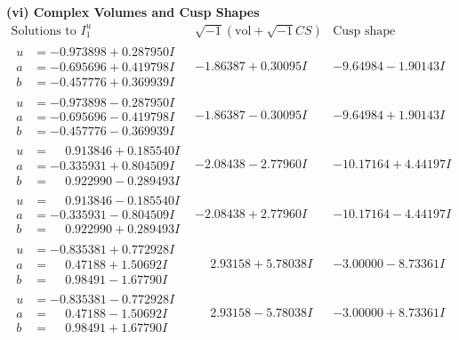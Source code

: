 \documentclass[1p]{elsarticle_modified}
\theoremstyle{definition}
\newcommand{\I}{\sqrt{-1}}
\begin{document}
\newpage\flushleft \textbf{(vi) Complex Volumes and Cusp Shapes}
$$\begin{array}{c|c|c}  
\text{Solutions to }I^u_{1}& \I (\text{vol} + \sqrt{-1}CS) & \text{Cusp shape}\\
 \hline 
\begin{aligned}
u &= -0.973898 + 0.287950 I \\
a &= -0.695696 + 0.419798 I \\
b &= -0.457776 + 0.369939 I\end{aligned}
 & -1.86387 + 0.30095 I & -9.64984 - 1.90143 I \\ \hline\begin{aligned}
u &= -0.973898 - 0.287950 I \\
a &= -0.695696 - 0.419798 I \\
b &= -0.457776 - 0.369939 I\end{aligned}
 & -1.86387 - 0.30095 I & -9.64984 + 1.90143 I \\ \hline\begin{aligned}
u &= \phantom{-}0.913846 + 0.185540 I \\
a &= -0.335931 + 0.804509 I \\
b &= \phantom{-}0.922990 - 0.289493 I\end{aligned}
 & -2.08438 - 2.77960 I & -10.17164 + 4.44197 I \\ \hline\begin{aligned}
u &= \phantom{-}0.913846 - 0.185540 I \\
a &= -0.335931 - 0.804509 I \\
b &= \phantom{-}0.922990 + 0.289493 I\end{aligned}
 & -2.08438 + 2.77960 I & -10.17164 - 4.44197 I \\ \hline\begin{aligned}
u &= -0.835381 + 0.772928 I \\
a &= \phantom{-}0.47188 + 1.50692 I \\
b &= \phantom{-}0.98491 - 1.67790 I\end{aligned}
 & \phantom{-}2.93158 + 5.78038 I & -3.00000 - 8.73361 I \\ \hline\begin{aligned}
u &= -0.835381 - 0.772928 I \\
a &= \phantom{-}0.47188 - 1.50692 I \\
b &= \phantom{-}0.98491 + 1.67790 I\end{aligned}
 & \phantom{-}2.93158 - 5.78038 I & -3.00000 + 8.73361 I \\ \hline\begin{aligned}

\end{aligned}
\end{array}$$
\end{document}
